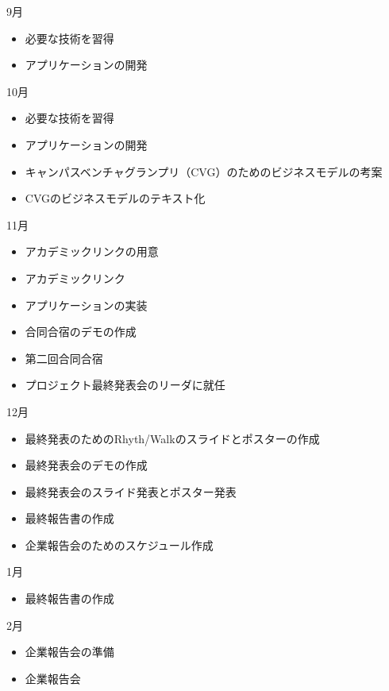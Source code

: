 9月
\begin{itemize}
\item 必要な技術を習得
\item アプリケーションの開発
\end{itemize}
10月
\begin{itemize}
\item 必要な技術を習得
\item アプリケーションの開発
\item キャンパスベンチャグランプリ（CVG）のためのビジネスモデルの考案
\item CVGのビジネスモデルのテキスト化
\end{itemize}
11月
\begin{itemize}
\item アカデミックリンクの用意
\item アカデミックリンク
\item アプリケーションの実装
\item 合同合宿のデモの作成
\item 第二回合同合宿
\item プロジェクト最終発表会のリーダに就任
\end{itemize}
12月
\begin{itemize}
\item 最終発表のためのRhyth/Walkのスライドとポスターの作成
\item 最終発表会のデモの作成
\item 最終発表会のスライド発表とポスター発表
\item 最終報告書の作成
\item 企業報告会のためのスケジュール作成
\end{itemize}
1月
\begin{itemize}
\item 最終報告書の作成
\end{itemize}
2月
\begin{itemize}
\item 企業報告会の準備
\item 企業報告会
\end{itemize}
